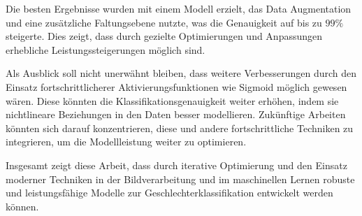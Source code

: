 \documentclass[journal,twoside,web]{ieeecolor}
\begin{document}
Die besten Ergebnisse wurden mit einem Modell erzielt, das Data Augmentation und eine zusätzliche Faltungsebene nutzte, was die Genauigkeit auf bis zu $99\%$ steigerte. Dies zeigt, dass durch gezielte Optimierungen und Anpassungen erhebliche Leistungssteigerungen möglich sind.

Als Ausblick soll nicht unerwähnt bleiben, dass weitere Verbesserungen durch den Einsatz fortschrittlicherer Aktivierungsfunktionen wie Sigmoid möglich gewesen wären. Diese könnten die Klassifikationsgenauigkeit weiter erhöhen, indem sie nichtlineare Beziehungen in den Daten besser modellieren. Zukünftige Arbeiten könnten sich darauf konzentrieren, diese und andere fortschrittliche Techniken zu integrieren, um die Modellleistung weiter zu optimieren.

Insgesamt zeigt diese Arbeit, dass durch iterative Optimierung und den Einsatz moderner Techniken in der Bildverarbeitung und im maschinellen Lernen robuste und leistungsfähige Modelle zur Geschlechterklassifikation entwickelt werden können.
\end{document}
